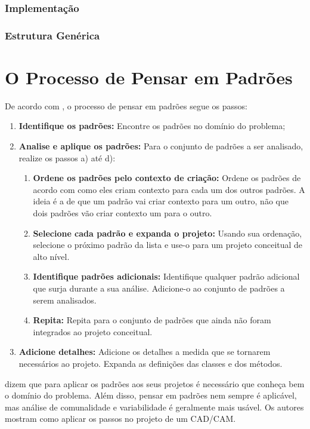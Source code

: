 \documentclass[
	11pt,				%
	openright,
	twoside,			%
	a4paper,			%
	english,			%
	french,
	brazil,				%
	sumario=tradicional
	]{abntex2}
\begin{document}
\subsubsection{Implementação}
\subsubsection{Estrutura Genérica}

\section{O Processo de Pensar em Padrões}

De acordo com , o processo de pensar em padrões segue os passos:
\begin{enumerate}
\item \textbf{Identifique os padrões:} Encontre os padrões no domínio do problema;
\item \textbf{Analise e aplique os padrões:} Para o conjunto de padrões a ser analisado, realize os passos a) até d):
\begin{enumerate}
\item \textbf{Ordene os padrões pelo contexto de criação:} Ordene os padrões de acordo com como eles criam contexto para cada um dos outros padrões. A ideia é a de que um padrão vai criar contexto para um outro, não que dois padrões vão criar contexto um para o outro.
\item \textbf{Selecione cada padrão e expanda o projeto:} Usando sua ordenação, selecione o próximo padrão da lista e use-o para um projeto conceitual de alto nível.
\item \textbf{Identifique padrões adicionais:} Identifique qualquer padrão adicional que surja durante a sua análise. Adicione-o ao conjunto de padrões a serem analisados.
\item \textbf{Repita:} Repita para o conjunto de padrões que ainda não foram integrados ao projeto conceitual.
\end{enumerate}
\item \textbf{Adicione detalhes:} Adicione os detalhes a medida que se tornarem necessários ao projeto. Expanda as definições das classes e dos métodos.
\end{enumerate}

\cite{DP:explained} dizem que para aplicar os padrões aos seus projetos é necessário que conheça bem o domínio do problema. Além disso, pensar em padrões nem sempre é aplicável, mas análise de comunalidade e variabilidade é geralmente mais usável. Os autores mostram como aplicar os passos no projeto de um CAD/CAM.
\end{document}
